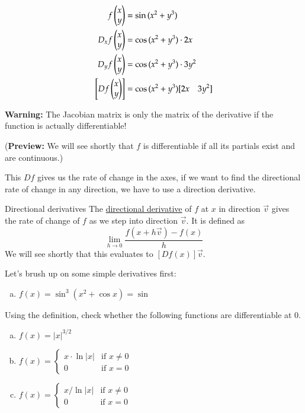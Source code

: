 \example
\begin{align*}
  f\begin{pmatrix} x \\ y \end{pmatrix} &= \sin{(x^2+y^3)} \\
  D_x f\begin{pmatrix} x \\ y \end{pmatrix} &= \cos{(x^2 + y^3)}\cdot 2x \\
  D_y f\begin{pmatrix} x \\ y \end{pmatrix} &= \cos{(x^2 + y^3)}\cdot 3y^2 \\
  \left[Df\begin{pmatrix} x \\ y \end{pmatrix}\right] &= \cos{(x^2 + y^3) [2x \quad 3y^2]}
\end{align*}

\textbf{Warning:} The Jacobian matrix is only the matrix of the derivative if the function is actually differentiable!

(\textbf{Preview:} We will see shortly that $f$ is differentiable if all its partials exist and are continuous.)

This $Df$ gives us the rate of change in the axes, if we want to find the directional rate of change in any direction, we have to use a direction derivative.

\begin{defn}{Directional derivatives}
The \ul{directional derivative} of $f$ at $x$ in direction $\vec{v}$ gives the rate of change of $f$ as we step into direction $\vec{v}$. It is defined as
\[\lim_{h\to 0}\frac{f(x+h\vec{v})-f(x)}{h}\]
We will see shortly that this evaluates to $[Df(x)]\vec{v}$.
\end{defn}

Let's brush up on some simple derivatives first:
\begin{enumerate}[a.]
  \item $f(x) = \sin^3{(x^2 + \cos{x})} = \sin$
\end{enumerate}

 Using the definition, check whether the following functions are differentiable at 0.
\begin{enumerate}[a.]
  \item $f(x) = |x|^{3/2}$
  \item $\displaystyle f(x) = \begin{cases}x \cdot \ln{|x|} & \text{if } x \neq 0 \\ 0 & \text{if } x = 0 \end{cases}$ \\
  \item $\displaystyle f(x) = \begin{cases}x/ \ln{|x|} & \text{if } x \neq 0 \\ 0 & \text{if } x = 0\end{cases}$ \\
\end{enumerate}
